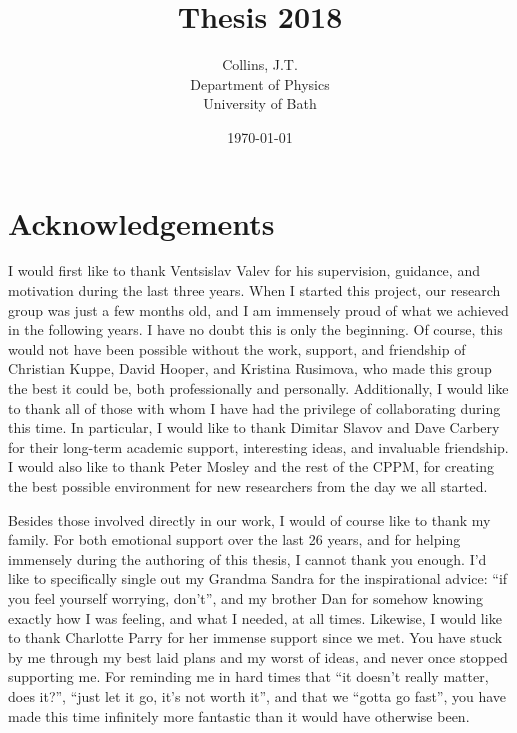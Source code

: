 \documentclass[11pt,a4paper,final]{report}
\title{Thesis 2018}
\author{
	Collins, J.T. \\ 
	Department of Physics\\
	University of Bath\\
}
\date{\today}
\begin{document}
\begin{titlepage}
    
\end{titlepage}

\begin{abstract}
	\setcounter{page}{0}  %
    
\end{abstract}
\clearpage

\clearpage 
\tableofcontents
\clearpage


\chapter*{Acknowledgements}
I would first like to thank Ventsislav Valev for his supervision, guidance, and motivation during the last three years. When I started this project, our research group was just a few months old, and I am immensely proud of what we achieved in the following years. I have no doubt this is only the beginning. Of course, this would not have been possible without the work, support, and friendship of Christian Kuppe, David Hooper, and Kristina Rusimova, who made this group the best it could be, both professionally and personally. Additionally, I would like to thank all of those with whom I have had the privilege of collaborating during this time. In particular, I would like to thank Dimitar Slavov and Dave Carbery for their long-term academic support, interesting ideas, and invaluable friendship. I would also like to thank Peter Mosley and the rest of the CPPM, for creating the best possible environment for new researchers from the day we all started. 

Besides those involved directly in our work, I would of course like to thank my family. For both emotional support over the last 26 years, and for helping immensely during the authoring of this thesis, I cannot thank you enough. I'd like to specifically single out my Grandma Sandra for the inspirational advice: ``if you feel yourself worrying, don't'', and my brother Dan for somehow knowing exactly how I was feeling, and what I needed, at all times. Likewise, I would like to thank Charlotte Parry for her immense support since we met. You have stuck by me through my best laid plans and my worst of ideas, and never once stopped supporting me. For reminding me in hard times that ``it doesn't really matter, does it?'', ``just let it go, it's not worth it'', and that we ``gotta go fast'', you have made this time infinitely more fantastic than it would have otherwise been.
\end{document}
